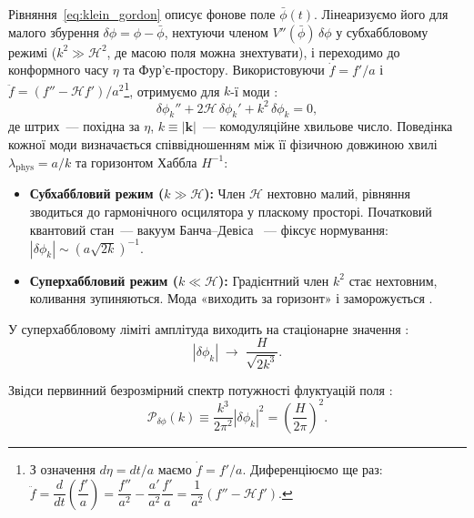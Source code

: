 \documentclass[12pt, a4paper]{article}
\begin{document}
Рівняння~\eqref{eq:klein_gordon} описує фонове поле $\bar{\phi}(t)$.
Лінеаризуємо його для малого збурення $\delta\phi = \phi - \bar{\phi}$,
нехтуючи членом $V''(\bar{\phi})\,\delta\phi$ у субхаббловому режимі
($k^2 \gg \mathcal{H}^2$, де масою поля можна знехтувати), і переходимо
до конформного часу $\eta$ та Фур'є-простору. Використовуючи
$\dot{f} = f'/a$ і $\ddot{f} = (f'' - \mathcal{H}f')/a^2$\footnote{%
З означення $d\eta = dt/a$ маємо $\dot{f} = f'/a$.
Диференціюємо ще раз:
$\ddot{f} = \dfrac{d}{dt}\!\left(\dfrac{f'}{a}\right)
= \dfrac{f''}{a^2} - \dfrac{a'}{a^2}\dfrac{f'}{a}
= \dfrac{1}{a^2}(f'' - \mathcal{H}f')$.},
отримуємо для $k$-ї моди \cite{mukhanov_2005}:
\begin{equation}\label{eq:fourier_field}
  \delta\phi_k'' + 2\mathcal{H}\,\delta\phi_k'
  + k^2\,\delta\phi_k = 0,
\end{equation}
де штрих~--- похідна за $\eta$, $k \equiv |\mathbf{k}|$~---
комодуляційне хвильове число. Поведінка кожної моди визначається
співвідношенням між її фізичною довжиною хвилі
$\lambda_\mathrm{phys} = a/k$ та горизонтом Хаббла $H^{-1}$:

\begin{itemize}
  \item \textbf{Субхаббловий режим ($k \gg \mathcal{H}$):}
        Член $\mathcal{H}$ нехтовно малий, рівняння зводиться до
        гармонічного осцилятора у пласкому просторі.
        Початковий квантовий стан~--- вакуум Банча--Девіса
        \cite{bunch_davies_1978}~--- фіксує нормування:
        $|\delta\phi_k| \sim (a\sqrt{2k})^{-1}$.
  \item \textbf{Суперхаббловий режим ($k \ll \mathcal{H}$):}
        Градієнтний член $k^2$ стає нехтовним, коливання
        зупиняються. Мода «виходить за горизонт» і
        заморожується \cite{hawking_1982}.
\end{itemize}

У суперхаббловому ліміті амплітуда виходить на стаціонарне
значення \cite{guth_pi_1982}:
\begin{equation*}
  |\delta\phi_k| \;\to\; \frac{H}{\sqrt{2k^3}}.
\end{equation*}

Звідси первинний безрозмірний спектр потужності флуктуацій поля
\cite{mukhanov_chibisov_1981}:
\begin{equation}\label{eq:field_power_spec}
  \mathcal{P}_{\delta\phi}(k)
    \equiv \frac{k^3}{2\pi^2}|\delta\phi_k|^2
    = \left(\frac{H}{2\pi}\right)^{\!2}.
\end{equation}
\end{document}
